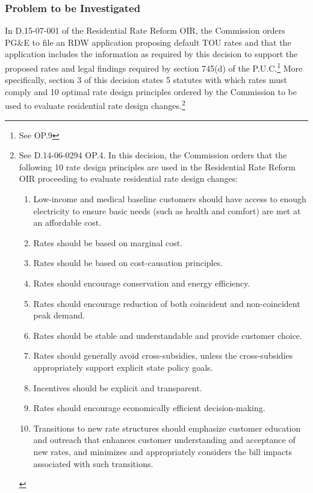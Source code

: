 \documentclass[12pt]{article}
\begin{document}
\subsubsection*{Problem to be Investigated}

In D.15-07-001 of the Residential Rate Reform OIR, the Commission orders PG\&E to file an RDW application proposing default TOU rates and that the application includes the information as required by this decision to support the proposed rates and legal findings required by section 745(d) of the P.U.C.\footnote{See OP.9} More specifically, section 3 of this decision states 5 statutes with which rates must comply and 10 optimal rate design principles ordered by the Commission to be used to evaluate residential rate design changes.\footnote{See D.14-06-0294 OP.4. In this decision, the Commission orders that the following 10 rate design principles are used in the Residential Rate Reform OIR proceeding to evaluate residential rate design changes:	
	
\begin{enumerate}
	\item Low-income and medical baseline customers should have access to enough electricity to ensure basic needs (such as health and comfort) are met at an affordable cost.
	
	\item Rates should be based on marginal cost.
	
	\item Rates should be based on cost-causation principles.
	
	\item Rates should encourage conservation and energy efficiency.
	
	\item Rates should encourage reduction of both coincident and non-coincident peak demand.
	
	\item Rates should be stable and understandable and provide customer choice.
	
	\item Rates should generally avoid cross-subsidies, unless the cross-subsidies appropriately support explicit state policy goals.
	
	\item Incentives should be explicit and transparent.
	
	\item Rates should encourage economically efficient decision-making.
	
	\item Transitions to new rate structures should emphasize customer education and outreach that enhances customer	understanding and acceptance of new rates, and minimizes and appropriately considers the bill impacts associated with such transitions.
\end{enumerate}
	
} 
\end{document}
